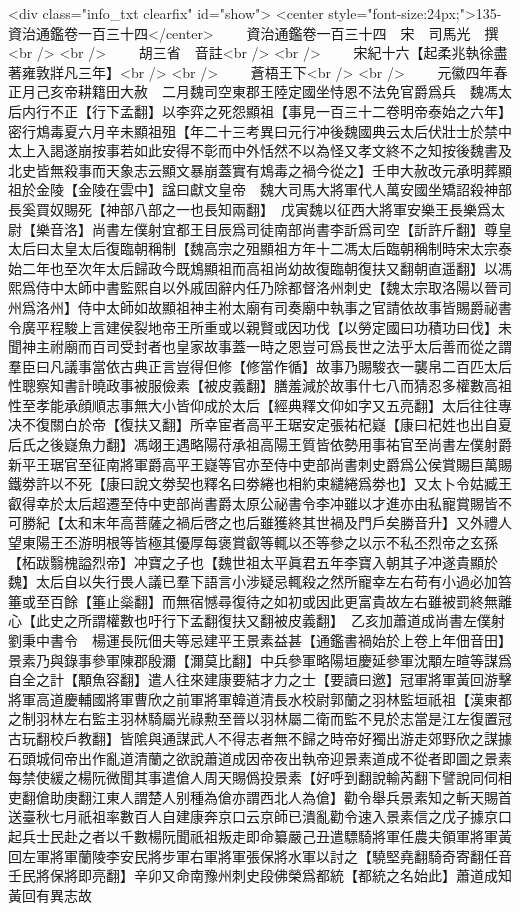 <div class="info_txt clearfix" id="show">
<center style="font-size:24px;">135-資治通鑑卷一百三十四</center>
  　　資治通鑑卷一百三十四　宋　司馬光　撰<br />
<br />
　　胡三省　音註<br />
<br />
　　宋紀十六【起柔兆執徐盡著雍敦牂凡三年】<br />
<br />
　　蒼梧王下<br />
<br />
　　元徽四年春正月己亥帝耕籍田大赦　二月魏司空東郡王陸定國坐恃恩不法免官爵爲兵　魏馮太后内行不正【行下孟翻】以李弈之死怨顯祖【事見一百三十二卷明帝泰始之六年】密行鴆毒夏六月辛未顯祖殂【年二十三考異曰元行冲後魏國典云太后伏壯士於禁中太上入謁遂崩按事若如此安得不彰而中外恬然不以為怪又孝文終不之知按後魏書及北史皆無殺事而天象志云顯文暴崩蓋實有鴆毒之禍今從之】壬申大赦改元承明葬顯祖於金陵【金陵在雲中】諡曰獻文皇帝　魏大司馬大將軍代人萬安國坐矯詔殺神部長奚買奴賜死【神部八部之一也長知兩翻】　戊寅魏以征西大將軍安樂王長樂爲太尉【樂音洛】尚書左僕射宜都王目辰爲司徒南部尚書李訢爲司空【訢許斤翻】尊皇太后曰太皇太后復臨朝稱制【魏高宗之殂顯祖方年十二馮太后臨朝稱制時宋太宗泰始二年也至次年太后歸政今既鴆顯祖而高祖尚幼故復臨朝復扶又翻朝直遥翻】以馮熙爲侍中太師中書監熙自以外戚固辭内任乃除都督洛州刺史【魏太宗取洛陽以晉司州爲洛州】侍中太師如故顯祖神主袝太廟有司奏廟中執事之官請依故事皆賜爵祕書令廣平程駿上言建侯裂地帝王所重或以親賢或因功伐【以勞定國曰功積功曰伐】未聞神主祔廟而百司受封者也皇家故事蓋一時之恩豈可爲長世之法乎太后善而從之謂羣臣曰凡議事當依古典正言豈得但修【修當作循】故事乃賜駿衣一襲帛二百匹太后性聰察知書計曉政事被服儉素【被皮義翻】膳羞減於故事什七八而猜忍多權數高祖性至孝能承顔順志事無大小皆仰成於太后【經典釋文仰如字又五亮翻】太后往往專决不復關白於帝【復扶又翻】所幸宦者高平王琚安定張祐杞嶷【康曰杞姓也出自夏后氏之後嶷魚力翻】馮翊王遇略陽苻承祖高陽王質皆依勢用事祐官至尚書左僕射爵新平王琚官至征南將軍爵高平王嶷等官亦至侍中吏部尚書刺史爵爲公侯賞賜巨萬賜鐵劵許以不死【康曰說文劵契也釋名曰劵綣也相約束繾綣爲劵也】又太卜令姑臧王叡得幸於太后超遷至侍中吏部尚書爵太原公祕書令李冲雖以才進亦由私寵賞賜皆不可勝紀【太和末年高菩薩之禍后啓之也后雖獲終其世禍及門戶矣勝音升】又外禮人望東陽王丕游明根等皆極其優厚每褒賞叡等輒以丕等參之以示不私丕烈帝之玄孫【柘跋翳槐謚烈帝】冲寶之子也【魏世祖太平眞君五年李寶入朝其子冲遂貴顯於魏】太后自以失行畏人議已羣下語言小涉疑忌輒殺之然所寵幸左右苟有小過必加笞箠或至百餘【箠止橤翻】而無宿憾尋復待之如初或因此更富貴故左右雖被罰終無離心【此史之所謂權數也吁行下孟翻復扶又翻被皮義翻】　乙亥加蕭道成尚書左僕射劉秉中書令　楊運長阮佃夫等忌建平王景素益甚【通鑑書禍始於上卷上年佃音田】景素乃與錄事參軍陳郡殷濔【濔莫比翻】中兵參軍略陽垣慶延參軍沈顒左暄等謀爲自全之計【顒魚容翻】遣人往來建康要結才力之士【要讀曰邀】冠軍將軍黃回游擊將軍高道慶輔國將軍曹欣之前軍將軍韓道清長水校尉郭蘭之羽林監垣祇祖【漢東都之制羽林左右監主羽林騎屬光祿勲至晉以羽林屬二衛而監不見於志當是江左復置冠古玩翻校戶教翻】皆隂與通謀武人不得志者無不歸之時帝好獨出游走郊野欣之謀據石頭城伺帝出作亂道清蘭之欲說蕭道成因帝夜出執帝迎景素道成不從者即圖之景素每禁使緩之楊阮微聞其事遣傖人周天賜僞投景素【好呼到翻說輸芮翻下譬說同伺相吏翻傖助庚翻江東人謂楚人别種為傖亦謂西北人為傖】勸令舉兵景素知之斬天賜首送臺秋七月祇祖率數百人自建康奔京口云京師已潰亂勸令速入景素信之戊子據京口起兵士民赴之者以千數楊阮聞祇祖叛走即命纂嚴己丑遣驃騎將軍任農夫領軍將軍黃回左軍將軍蘭陵李安民將步軍右軍將軍張保將水軍以討之【驍堅堯翻騎奇寄翻任音壬民將保將即亮翻】辛卯又命南豫州刺史段佛榮爲都統【都統之名始此】蕭道成知黃回有異志故